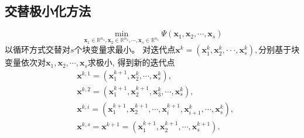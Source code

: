 \subsection{交替极小化方法}
\[
    \min_{\boldsymbol{x}_1\in\mathbb{R}^{n_1},\boldsymbol{x}_2\in\mathbb{R}^{n_2},\cdots,\boldsymbol{x}_s\in\mathbb{R}^{n_s}}\Psi(\boldsymbol{x}_1,\boldsymbol{x}_2,\cdots,\boldsymbol{x}_s)
\]
以循环方式交替对$s$个块变量求最小。
对迭代点$\boldsymbol{x}^k=(\boldsymbol{x}_1^k,\boldsymbol{x}_2^k,\cdotp\cdotp\cdotp,\boldsymbol{x}_s^k), $分别基于块变量依次对$\boldsymbol{x}_1,\boldsymbol{x}_2,\cdots,\boldsymbol{x}_s$求极小, 得到新的迭代点
\[
    \begin{aligned}
        &\boldsymbol{x}^{k,1}=(\boldsymbol{x}_{1}^{k+1},\boldsymbol{x}_{2}^{k},\cdots,\boldsymbol{x}_{s}^{k}),\\
        &\boldsymbol{x}^{k,2}=(\boldsymbol{x}_{1}^{k+1},\boldsymbol{x}_{2}^{k+1},\boldsymbol{x}_{3}^{k},\cdots,\boldsymbol{x}_{s}^{k}),\\
        &\boldsymbol{x}^{k,i}=(\boldsymbol{x}_{1}^{k+1},\boldsymbol{x}_{2}^{k+1},\cdots,\boldsymbol{x}_{i}^{k+1},\boldsymbol{x}_{i+1}^{k},\cdots,\boldsymbol{x}_{s}^{k}),\\
        &\boldsymbol{x}^{k,s}=\boldsymbol{x}^{k+1}=(\boldsymbol{x}_{1}^{k+1},\boldsymbol{x}_{2}^{k+1},\cdots,\boldsymbol{x}_{s}^{k+1}).
    \end{aligned}
\]

